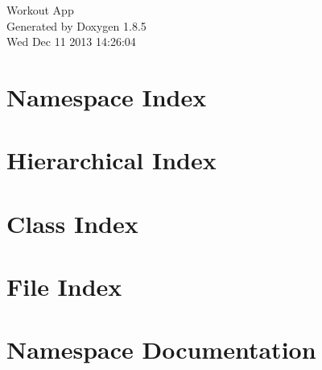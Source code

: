 \documentclass[twoside]{book}
\newcommand{\clearemptydoublepage}{%
  \newpage{\pagestyle{empty}\cleardoublepage}%
}
\begin{document}
\hypersetup{pageanchor=false}
\begin{titlepage}
\vspace*{7cm}
\begin{center}%
{\Large Workout App }\\
\vspace*{1cm}
{\large Generated by Doxygen 1.8.5}\\
\vspace*{0.5cm}
{\small Wed Dec 11 2013 14:26:04}\\
\end{center}
\end{titlepage}
\clearemptydoublepage
\tableofcontents
\clearemptydoublepage
{}
\hypersetup{pageanchor=true}

\chapter{Namespace Index}

\chapter{Hierarchical Index}

\chapter{Class Index}

\chapter{File Index}

\chapter{Namespace Documentation}






\end{document}
